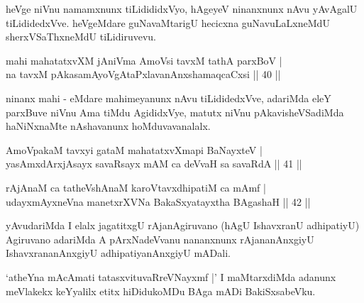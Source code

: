 \begin{artha}
heVge niVnu namamxnunx tiLidididxVyo, hAgeyeV ninanxnunx nAvu yAvAgalU tiLididedxVve. heVgeMdare guNavaMtarigU hecicxna guNavuLaLxneMdU sherxVSaThxneMdU tiLidiruvevu.
\end{artha}


\begin{shl}
mahi mahatatxvXM jAniVma AmoV\s si tavxM tathA parxBoV | \\
na tavxM pAkasamAyoVgAtaPxlavanAnxshamaqcaCxsi \hfill|| 40 || 
\end{shl}

\begin{artha}
ninanx mahi - eMdare mahimeyanunx nAvu tiLididedxVve, adariMda eleY parxBuve niVnu Ama tiMdu AgididxVye, matutx niVnu pAkavisheVSadiMda haNiNxnaMte nAshavanunx hoMduvavanalalx.
\end{artha}

\begin{shl}
AmoV\s pakaM tavxyi gataM mahatatxvXmapi BaNayxteV | \\
yasAmxdArxjA\s sayx savaRsayx mAM ca deVvaH sa savaRdA \hfill|| 41 || 
\end{shl}

\begin{shl}
rAjAnaM ca tatheVshAnaM karoVtavxdhipatiM ca mAmf | \\
udayxmAyxneVna manetxrXVNa BakaSxyatayxtha BAgashaH \hfill|| 42 || 
\end{shl}

\begin{artha}
yAvudariMda I elalx jagatitxgU rAjanAgiruvano (hAgU IshavxranU adhipatiyU) Agiruvano adariMda A pArxNadeVvanu nananxnunx rAjananAnxgiyU IshavxrananAnxgiyU adhipatiyanAnxgiyU mADali.
\end{artha}

\begin{artha}
`atheYna mAcAmati tatasxvituvaRreVNayxmf |' I maMtarxdiMda adanunx meVlakekx keYyalilx etitx hiDidukoMDu BAga mADi BakiSxsabeVku.
\end{artha}



